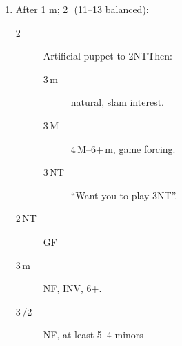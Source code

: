 \documentclass[12pt]{article}
\begin{document}
\begin{footnotesize}
\begin{enumerate}
\begin{enumerate}[label*=\arabic*,nosep]
            \item \label{itm:1d2m2h_resp} After 1\,\,m; 2\,\rh\ (11--13 balanced):
            \begin{description}
                \item [2\,\bs] Artificial puppet to 2NT\.
                    Then:
                \begin{description}
                    \item [3\,m] natural, slam interest.
                    \item [3\,M] 4\,M--6+\,m, game forcing.
                    \item[3\,NT] ``Want you to play 3NT''.
                \end{description}
                \item[2\,NT] GF\,
                \item[3\,m] NF, INV, 6+.
                \item[3\,\bc/2\,\rd] NF, at least 5--4 minors
            \end{description}
        \end{enumerate}
    \end{enumerate}
\end{footnotesize}
\end{document}
